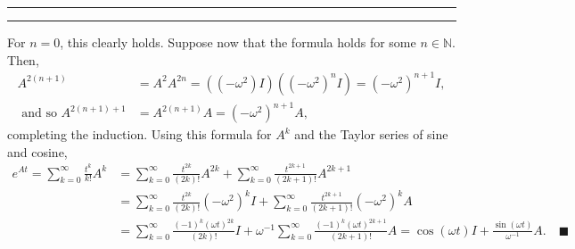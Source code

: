 \documentclass[11pt]{article}
\newcounter{questionCounter}
\newcounter{partCounter}[questionCounter]
\newenvironment{question}[2][\arabic{questionCounter}]{%
    \setcounter{partCounter}{0}%
    \vspace{.25in} \hrule \vspace{0.5em}%
        \noindent{\bf #2}%
    \vspace{0.8em} \hrule \vspace{.10in}%
    \addtocounter{questionCounter}{1}%
}{}
\newcommand{\mqed}{\quad \blacksquare}
\newcommand{\inv}{^{-1}}
\newcommand{\N}{\mathbb{N}} %
\begin{document}
\begin{question}{Problem 2}
\begin{enumerate}[(A)]
For $n = 0$, this clearly holds.
Suppose now that the formula holds for some $n \in \N$. Then,
\begin{align*}
A^{2(n + 1)}
 & = A^2A^{2n}
   = ((-\omega^2)I)((-\omega^2)^nI)
   = (-\omega^2)^{n + 1}I, \\
\mbox{ and so }
A^{2(n + 1) + 1}
 & = A^{2(n + 1)}A
   = (-\omega^2)^{n + 1}A,
\end{align*}
completing the induction. Using this formula for $A^k$ and the Taylor
series of sine and cosine,
\begin{align*}
e^{At}
   = \sum_{k = 0}^{\infty} \frac{t^k}{k!}A^k
 & = \sum_{k = 0}^{\infty} \frac{t^{2k}}{(2k)!}A^{2k}
   + \sum_{k = 0}^{\infty} \frac{t^{2k + 1}}{(2k + 1)!}A^{2k + 1} \\
 & = \sum_{k = 0}^{\infty} \frac{t^{2k}}{(2k)!}(-\omega^2)^k I
   + \sum_{k = 0}^{\infty}
                        \frac{t^{2k + 1}}{(2k + 1)!}(-\omega^2)^k A \\
 & = \sum_{k = 0}^{\infty} \frac{(-1)^k(\omega t)^{2k}}{(2k)!} I
   + \omega\inv \sum_{k = 0}^{\infty}
                        \frac{(-1)^k(\omega t)^{2k + 1}}{(2k + 1)!} A
   = \cos(\omega t) I + \frac{\sin(\omega t)}{\omega\inv} A. \mqed
\end{align*}
\end{enumerate}
\end{question}
\end{document}
